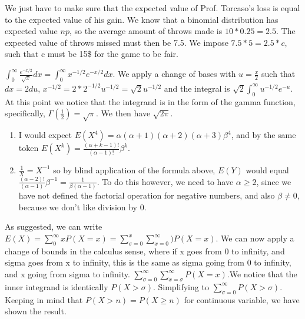 \documentclass{article}
\begin{document}
\begin{prob}
	We just have to make sure that the expected value of Prof. Torcaso's loss is equal to the expected value of his gain.
	We know that a binomial distribution has expected value $np$, so the average amount of throws made is $10*0.25 =2.5$.
	The expected value of throws missed must then be 7.5.
	We impose $7.5*5=2.5*c$, such that c must be 15\$ for the game to be fair.
\end{prob}

\begin{prob}
	$\int_{0}^{\infty}\frac{e^{-x/2}}{\sqrt{x}}dx= \int^{\infty}_{0}x^{-1/2}e^{-x/2}dx$.
	We apply a change of bases with $u=\frac{x}{2}$ such that $dx=2du$, $x^{-1/2}=2*2^{-1/2}u^{-1/2}=\sqrt{2}u^{-1/2}$  and the integral is $\sqrt{2}\int^{\infty}_{0}u^{-1/2}e^{-u}$.
	At this point we notice that the integrand is in the form of the gamma function, specifically, $\Gamma(\frac{1}{2})=\sqrt{\pi}$.
We then have $\sqrt{2\pi}$.
\end{prob}

\begin{prob}
	\begin{enumerate}
		\item I would expect $E(X^4)=\alpha(\alpha+1)(\alpha+2)(\alpha+3)\beta^4$, and by the same token $E(X^k)=\frac{(\alpha+k-1)!}{(\alpha-1)!}\beta^k$. 

		\item $\frac{1}{X}=X^{-1}$ so by blind application of the formula above, $E(Y)$ would equal $\frac{(\alpha -2)!}{(\alpha-1)}\beta^{-1}=\frac{1}{\beta (\alpha-1)}$.
		To do this however, we need to have $\alpha \geq 2$, since we have not defined the factorial operation for negative numbers, and also $\beta \neq 0$, because we don't like division by 0.
	\end{enumerate}
\end{prob}

\begin{prob}
	As suggested, we can write $E(X)= \sum^{\infty}_{0}xP(X=x)= \sum^{x}_{\sigma=0}\sum_{x=0}^{\infty})P(X=x)$.
	We can now apply a change of bounds in the calculus sense, where if x goes from 0 to infinity, and sigma goes from x to infinity, this is the same as sigma going from 0 to infinity, and x going from sigma to infinity.
	 $\sum^{\infty}_{\sigma=0}\sum_{x=\sigma}^{\infty}P(X=x)$.We notice that the inner integrand is identically $P(X>\sigma)$.
	 Simplifying to $\sum_{\sigma = 0}^{\infty}P(X>\sigma)$. Keeping in mind that $P(X>n)=P(X \geq n)$ for continuous variable, we have shown the result.
\end{prob}
\end{document}
